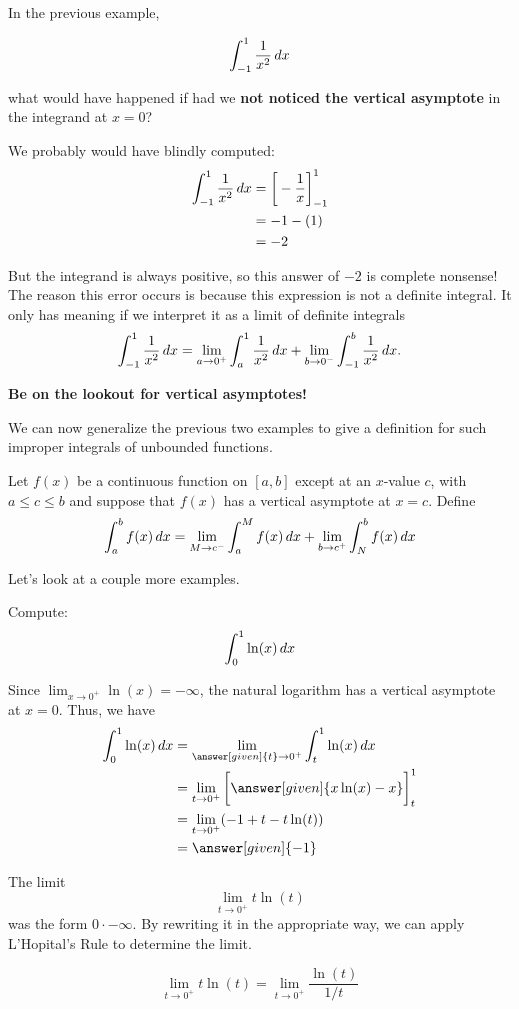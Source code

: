 \documentclass{ximera}
\begin{document}
\begin{warning}
In the previous example,

\[
\int_{-1}^{1} \frac{1}{x^2} \mathop{}\!d x
\]

 what would have happened if had we \textbf{not
  noticed the vertical asymptote} in the integrand at $x=0$?

We probably would have blindly computed:
\begin{align*}
  \int_{-1}^1\frac1{x^2}\mathop{}\!d x &= \bigg[ -\frac{1}{x} \bigg]_{-1}^1\\
  &= -1 - (1)\\
  &=-2
\end{align*}

But the integrand is always positive, so this answer of $-2$ is
complete nonsense! The reason this error occurs is because this expression is not a definite integral. It only has meaning if we
interpret it as a limit of definite integrals 
\[
 \int_{-1}^1 \frac{1}{x^2} \mathop{}\!d x = \lim_{a \to 0^+} \int_{a}^1 \frac{1}{x^2} \mathop{}\!d x  + \lim_{b \to 0^-} \int_{-1}^{b} \frac{1}{x^2} \mathop{}\!d x.
\]


\textbf{Be on the lookout for vertical asymptotes!}
\end{warning}


We can now generalize the previous two examples to give a definition for such 
improper integrals of unbounded functions.

\begin{definition}
Let $f(x)$ be a continuous function on $[a,b]$ except at an $x$-value $c$, with $a\leq
c\leq b$ and suppose that $f(x)$ has a vertical asymptote at $x=c$. Define
\[
\int_a^b f(x)\mathop{}\!d x = \lim_{M\to c^-}\int_a^M f(x)\mathop{}\!d x + \lim_{b\to c^+}\int_N^b f(x)\mathop{}\!d x
\]
\end{definition}

Let's look at a couple more examples. 


\begin{example}
  Compute:
  \[
  \int_0^1 \ln(x)\mathop{}\!d x
  \]
  \begin{explanation}
    Since $\lim_{x\to 0^+} \ln(x) = -\infty$, the natural logarithm
    has a vertical asymptote at $x = 0$. Thus, we have
    \begin{align*}
    \int_0^1 \ln(x) \d x &=\lim_{\answer[given]{t}\to 0^+} \int_t^1 \ln(x) \d x \\
    &= \lim_{t\to 0^+} \eval{\answer[given]{x \ln(x)-x}}_t^1 \\
    &=\lim_{t \to 0^{+}} ( -1 + t - t\ln(t) ) \\
&=\answer[given]{ -1} 
      \end{align*}
\begin{hint}
The limit 
\[
\lim_{t \to 0^{+}} t\ln(t)
\]
was the form $0\cdot -\infty$. By rewriting it in the appropriate way, we can apply L'Hopital's Rule to 
determine the limit. 

\[
\lim_{t \to 0^{+}} t\ln(t) =\lim_{t \to 0^{+}} \frac{\ln(t)}{1/t}
\]
\end{hint}
  \end{explanation}
\end{example}
\end{document}
